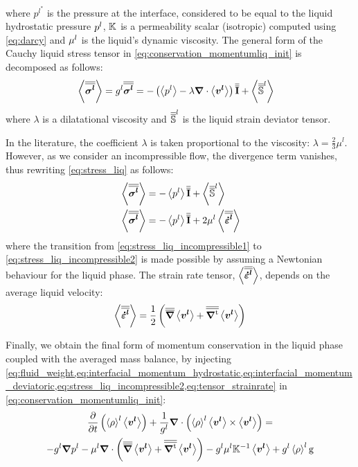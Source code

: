 where $p^{l^{*}}$ is the pressure at the interface, considered to be equal to the liquid hydrostatic 
pressure ${p^l}$, $\mathbb{K}$ is a permeability scalar (isotropic) computed using \cref{eq:darcy} and $\mu^l$ is the liquid's 
dynamic viscosity. The general form of the Cauchy liquid stress tensor in \cref{eq:conservation_momentumliq_init} 
is decomposed as follows: 
\begin{align}
\label{eq:stress_liq}
& \avg{\sigmal} = \gl \sigmal = - \brac{\avg{\pl} -\lambda \nabvec \cdot \vit} \I + \avg{\mat{\mathbb{S}}^{l}}
\end{align}
where $\lambda$ is a dilatational viscosity \citep{dantzig_solidification_2009} and ${\overline{\overline{\boldsymbol{\mathbb{S}}}}}^{l}$ is the
liquid strain deviator tensor. 

In the literature, the coefficient $\lambda$ is taken proportional to the 
viscosity: $\lambda = \frac{2}{3} \mu^l $. However, as we consider an incompressible flow, the divergence 
term vanishes, thus rewriting \cref{eq:stress_liq} as follows:
\begin{subequations} 
\begin{align}
\label{eq:stress_liq_incompressible1}
& \avg{\sigmal} = - \avg{\pl} \I + \avg{\mat{\mathbb{S}}^{l}} \\
\label{eq:stress_liq_incompressible2}
& \avg{\sigmal} = - \avg{\pl} \I + 2 \mul \strainrateliq 
\end{align}
\end{subequations}
where the transition from \cref{eq:stress_liq_incompressible1} to \cref{eq:stress_liq_incompressible2} is made
possible by assuming a Newtonian behaviour for the liquid phase. The strain rate tensor, $\left \langle {\overline{\overline{\ensuremath{\boldsymbol{\dot{\varepsilon}^l}}}}} \right \rangle$, depends on 
the average liquid velocity:
\begin{align}
\label{eq:tensor_strainrate}
\strainrateliq = \frac{1}{2} \brac{\nabmat \vit  +  \nabmattransp \vit}
\end{align}

Finally, we obtain the final form of momentum conservation in the liquid phase coupled with the averaged 
mass balance, by injecting \cref{eq:fluid_weight,eq:interfacial_momentum_hydrostatic,eq:interfacial_momentum_deviatoric,eq:stress_liq_incompressible2,eq:tensor_strainrate}
in \cref{eq:conservation_momentumliq_init}:
\begin{multline}
\label{eq:conservation_momentumliq}
 \temp{ \rhol \vit } + \frac{1}{\gl} \nabvec \cdot \brac{\rhol \vit \times \vit} = \\
	  - \gl\nabvec \pl - \mul \nabvec \cdot \brac{\nabmat \vit + \nabmattransp \vit}
	  - \gl \mul \K^{-1} \vit + \gl \rhol \gravity
\end{multline}


